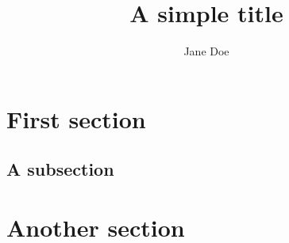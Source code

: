 \documentclass[11pt, english]{article}
\title{A simple title}
\author{Jane Doe}
\begin{document}
\maketitle

\section{First section}

  \lipsum[4]
  
  \subsection{A subsection}

    \lipsum[2]

\section{Another section}

  \lipsum[3]
\end{document}
